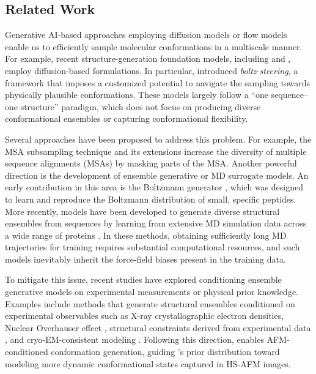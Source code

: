 \subsection{Related Work}
\label{subsec:related_work}

Generative AI-based approaches employing diffusion models or flow models enable us to efficiently sample molecular conformations in a multiscale manner. For example, recent structure-generation foundation models, including \AFiii and \Boltzi, employ diffusion-based formulations. In particular, \Boltzii \cite{passaro2025boltz2} introduced \emph{boltz-steering}, a framework that imposes a customized potential to navigate the sampling towards physically plausible conformations. These models largely follow a ``one sequence--one structure'' paradigm, which does not focus on producing diverse conformational ensembles or capturing conformational flexibility. 

Several approaches have been proposed to address this problem. For example, the MSA subsampling technique \cite{delAlamo2022sampling} and its extensions \cite{Wayment-Steele2023MSAClustering, daSilva2024_subsampledAF2, KalakotiWallner2025_AFsample2} increase the diversity of multiple sequence alignments (MSAs) by masking parts of the MSA. 
Another powerful direction is the development of ensemble generative or MD surrogate models. An early contribution in this area is the Boltzmann generator \cite{NoeOlssonKohlerWu2019_BoltzmannGenerators}, which was designed to learn and reproduce the Boltzmann distribution of small, specific peptides. More recently, models have been developed to generate diverse structural ensembles from sequences by learning from extensive MD simulation data across a wide range of proteins \cite{jing2023eigenfold, jing2024alphaflow, Zheng2024_DiG_NatMachIntell, Cheng2024_AlphaFolding, jing2024mdgen, jin2025p2dflow, bioemu2025}. In these methods, obtaining sufficiently long MD trajectories for training requires substantial computational resources, and such models inevitably inherit the force-field biases present in the training data. 

To mitigate this issue, recent studies have explored conditioning ensemble generative models on experimental measurements or physical prior knowledge. Examples include methods that generate structural ensembles conditioned on experimental observables such as X-ray crystallographic electron densities, Nuclear Overhauser effect \cite{maddipatla2025inverse}, structural constraints derived from experimental data \cite{Liu2025_ExEnDiff}, and cryo-EM-consistent modeling \cite{raghu2025multiscale, levy2024solving}. Following this direction, \Model enables AFM-conditioned conformation generation, guiding \AFiii's prior distribution toward modeling more dynamic conformational states captured in HS-AFM images.
